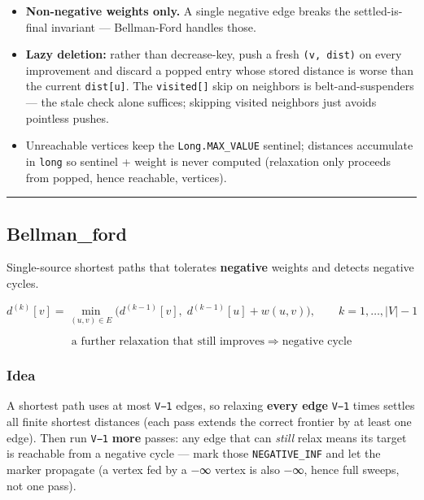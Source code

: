 \documentclass[
  10pt,
  letterpaper,
  onecolumn]{article}
\providecommand{\tightlist}{%
  \setlength{\itemsep}{0pt}\setlength{\parskip}{0pt}}
\begin{document}
\begin{itemize}
\tightlist
\item
  \textbf{Non-negative weights only.} A single negative edge breaks the
  settled-is-final invariant --- Bellman-Ford handles those.
\item
  \textbf{Lazy deletion:} rather than decrease-key, push a fresh
  \texttt{(v,\ dist)} on every improvement and discard a popped entry
  whose stored distance is worse than the current \texttt{dist{[}u{]}}.
  The \texttt{visited{[}{]}} skip on neighbors is belt-and-suspenders
  --- the stale check alone suffices; skipping visited neighbors just
  avoids pointless pushes.
\item
  Unreachable vertices keep the \texttt{Long.MAX\_VALUE} sentinel;
  distances accumulate in \texttt{long} so sentinel + weight is never
  computed (relaxation only proceeds from popped, hence reachable,
  vertices).
\end{itemize}

\begin{center}\rule{0.5\linewidth}{0.5pt}\end{center}

\hypertarget{bellman_ford}{%
\subsection{Bellman\_ford}\label{bellman_ford}}

Single-source shortest paths that tolerates \textbf{negative} weights
and detects negative cycles.

\begin{equation*}
d^{(k)}[v]=\min_{(u,v)\in E}\bigl(d^{(k-1)}[v],\;d^{(k-1)}[u]+w(u,v)\bigr),
\qquad k=1,\dots,|V|-1
\end{equation*}

\begin{equation*}
\text{a further relaxation that still improves} \;\Longrightarrow\; \text{negative cycle}
\end{equation*}

\hypertarget{idea-18}{%
\subsubsection{Idea}\label{idea-18}}

A shortest path uses at most \texttt{V−1} edges, so relaxing
\textbf{every edge} \texttt{V−1} times settles all finite shortest
distances (each pass extends the correct frontier by at least one edge).
Then run \texttt{V−1} \textbf{more} passes: any edge that can
\emph{still} relax means its target is reachable from a negative cycle
--- mark those \texttt{NEGATIVE\_INF} and let the marker propagate (a
vertex fed by a −∞ vertex is also −∞, hence full sweeps, not one pass).
\end{document}
